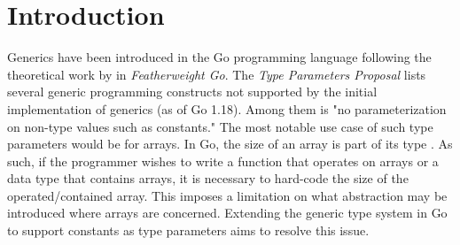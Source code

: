 \section{Introduction}

Generics have been introduced in the Go programming language following the
theoretical work by \cite{fg} in \emph{Featherweight Go}. The \emph{Type
Parameters Proposal} lists several generic programming constructs not supported
by the initial implementation of generics (as of Go 1.18). Among them is "no
parameterization on non-type values such as constants."
\autocite{genericsProposal} The most notable use case of such type parameters
would be for arrays. In Go, the size of an array is part of its type
\autocite{spec}. As such, if the programmer wishes to write a function that
operates on arrays or a data type that contains arrays, it is necessary to
hard-code the size of the operated/contained array. This imposes a limitation on
what abstraction may be introduced where arrays are concerned. Extending the
generic type system in Go to support constants as type parameters aims to
resolve this issue.
